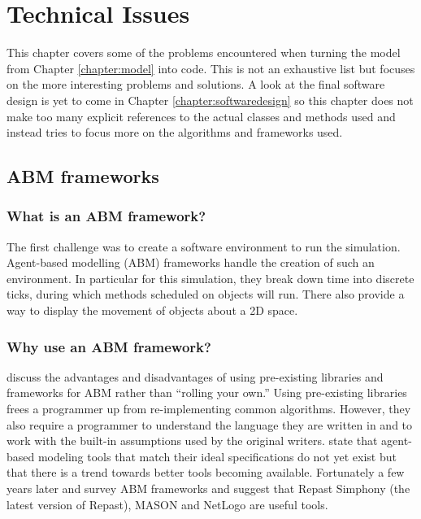 \chapter{Technical Issues}\label{chapter:technicalissues}
This chapter covers some of the problems encountered when turning the model from Chapter \ref{chapter:model} into code. This is not an exhaustive list but focuses on the more interesting problems and solutions. A look at the final software design is yet to come in Chapter \ref{chapter:softwaredesign} so this chapter does not make too many explicit references to the actual classes and methods used and instead tries to focus more on the algorithms and frameworks used.

  \section{ABM frameworks}
    \subsection{What is an ABM framework?}
    The first challenge was to create a software environment to run the simulation. Agent-based modelling (ABM) frameworks handle the creation of such an environment. In particular for this simulation, they break down time  into discrete ticks, during which methods scheduled on objects will run. There also provide a way to display the movement of objects about a 2D space.
    
    \subsection{Why use an ABM framework?}
    \textcite{Gilbert2002} discuss the advantages and
    disadvantages of using pre-existing libraries and frameworks for ABM rather
    than ``rolling your own.'' Using pre-existing libraries frees a
    programmer up from re-implementing common
    algorithms. However, they also require a programmer to understand the
    language they are written in and to work with the built-in
    assumptions used by the original writers. \textcite{Gilbert2002} state
    that agent-based modeling tools that match their ideal specifications
    do not yet exist but that there is a trend towards better
    tools becoming available. Fortunately a few years later \textcite{Allan2009} and \textcite{Berryman2008} survey ABM frameworks and suggest that Repast Simphony (the latest version of Repast), MASON and NetLogo are useful tools.
    

